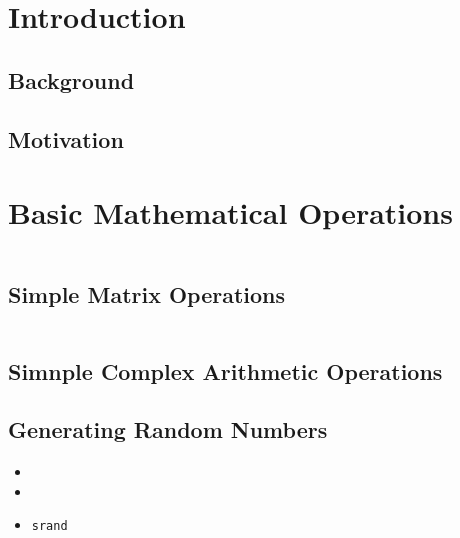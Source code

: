 
\tableofcontents
\section{Introduction}

\subsection{Background}

\subsection{Motivation}


\newpage
\section{Basic Mathematical Operations}

\begin{framed}
\begin{verbatim}

\end{verbatim}
\end{framed}
\subsection{Simple Matrix Operations}

\begin{framed}
\begin{verbatim}

\end{verbatim}
\end{framed}
\subsection{Simnple Complex Arithmetic Operations}

\subsection{Generating Random Numbers}

\begin{itemize}
\item
\item
\item \texttt{srand}
\end{itemize}

